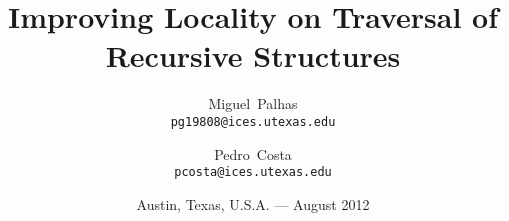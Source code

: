 

\titlehead{University of Texas%
\\%
\hfill Institute for Computational Engineering and Sciences%
\hfill Center for Distributed and Grid Computing}

\title{Improving Locality on Traversal of Recursive Structures}


\author{Miguel~Palhas\\\texttt{\smaller pg19808@ices.utexas.edu}%
\and Pedro~Costa\\\texttt{\smaller pcosta@ices.utexas.edu}%
}

\date{Austin, Texas, U.S.A. --- August 2012}

\subject{Summer Internship}